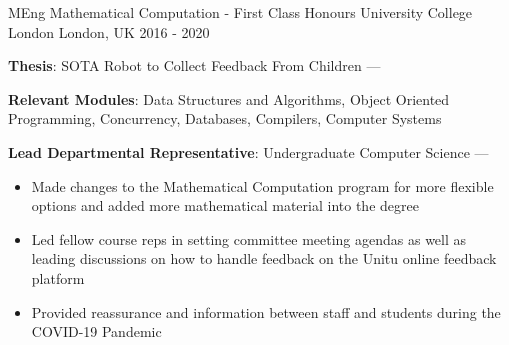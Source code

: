 
\begin{cventries}
  \cventry
    {MEng Mathematical Computation - First Class Honours} %
    {University College London} %
    {London, UK} %
    {2016 - 2020} %
    {
      \begin{cvitems} %
         \item {\textbf{Thesis}: SOTA Robot to Collect Feedback From Children --- }
         \item{\textbf{Relevant Modules}: Data Structures and Algorithms, Object Oriented Programming, Concurrency, Databases, Compilers, Computer Systems}
         \item {\textbf{Lead Departmental Representative}: Undergraduate Computer Science --- 
         \begin{itemize}
           \item Made changes to the Mathematical Computation program for more flexible options and added more mathematical material into the degree
           \item Led fellow course reps in setting committee meeting agendas as well as leading discussions on how to handle feedback on the Unitu online feedback platform
           \item Provided reassurance and information between staff and students during the COVID-19 Pandemic
         \end{itemize}
         }
      \end{cvitems}
    }
\end{cventries}